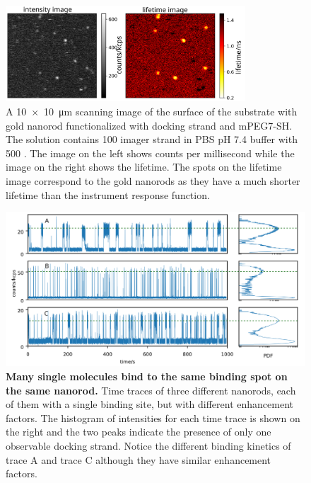 \begin{figure}[ht]
  \centering
  \includegraphics[width=0.8\textwidth]{trans_int_lt_img}
  \makeatletter
  \renewcommand{\fnum@figure}{\figurename~S\thefigure}
  \makeatother
  \caption{A \SI[product-units=power]{10x10}{\um} scanning image of the surface of the substrate with gold nanorod functionalized with docking strand and mPEG7-SH.
  The solution contains \SI{100}{\nM} imager strand in PBS pH 7.4 buffer with \SI{500}{\mM} .
  The image on the left shows counts per millisecond while the image on the right shows the lifetime.
  The spots on the lifetime image correspond to the gold nanorods as they have a much shorter lifetime than the instrument response function.}
  \label{SIfig:trans_int_lt}
\end{figure}
\begin{figure}[ht]
  \centering
  \includegraphics[width=\textwidth]{bleaching_free_longtrace}
  \makeatletter
  \renewcommand{\fnum@figure}{\figurename~S\thefigure}
  \makeatother
  \caption{\textbf{Many single molecules bind to the same binding spot on the same nanorod.} Time traces of three different nanorods, each of them with a single binding site, but with different enhancement factors.
  The histogram of intensities for each time trace is shown on the right and the two peaks indicate the presence of only one observable docking strand.
  Notice the different binding kinetics of trace A and trace C although they have similar enhancement factors.}
  \label{SIfig:bleaching_free_longtrace}
\end{figure}

